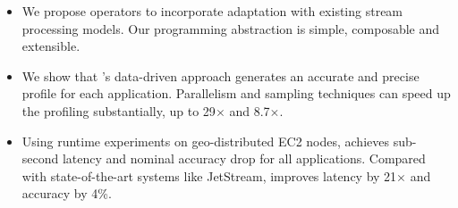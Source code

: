 \begin{itemize}[leftmargin=*, topsep=2pt, itemsep=0pt]

\item We propose \maybe{} operators to incorporate adaptation with existing
  stream processing models. Our programming abstraction is simple, composable
  and extensible.

\item We show that \sysname{}'s data-driven approach generates an accurate and
  precise profile for each application. Parallelism and sampling techniques can
  speed up the profiling substantially, up to 29$\times$ and 8.7$\times$\@.

\item Using runtime experiments on geo-distributed EC2 nodes, \sysname{}
  achieves sub-second latency and nominal accuracy drop for all
  applications. Compared with state-of-the-art systems like JetStream,
  \sysname{} improves latency by 21$\times$ and accuracy by 4\%.

\end{itemize}


